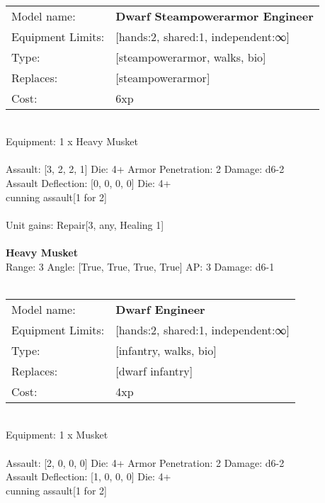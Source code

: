  
\ \\

\noindent
\begin{tabular}{ll}
Model name: &{\bf Dwarf Steampowerarmor Engineer } \\
Equipment Limits: &[hands:2, shared:1, independent:∞] \\
Type: &[steampowerarmor, walks, bio] \\
Replaces: &[steampowerarmor] \\
Cost: & 6xp\\
\end{tabular}
\ \\
Equipment: 1 x Heavy Musket \\
\ \\
Assault: [3, 2, 2, 1] Die: 4+ Armor Penetration: 2 Damage: d6-2 \\
Assault Deflection: [0, 0, 0, 0] Die: 4+\\
\indent cunning assault[1 for 2]\\ 
 
\ \\
Unit gains: Repair[3, any, Healing 1]\\ 

\ \\
{\bf Heavy Musket } \\



Range: 3  Angle: [True, True, True, True] AP: 3 Damage: d6-1 \\




 
\ \\

\noindent
\begin{tabular}{ll}
Model name: &{\bf Dwarf Engineer } \\
Equipment Limits: &[hands:2, shared:1, independent:∞] \\
Type: &[infantry, walks, bio] \\
Replaces: &[dwarf infantry] \\
Cost: & 4xp\\
\end{tabular}
\ \\
Equipment: 1 x Musket \\
\ \\
Assault: [2, 0, 0, 0] Die: 4+ Armor Penetration: 2 Damage: d6-2 \\
Assault Deflection: [1, 0, 0, 0] Die: 4+\\
\indent cunning assault[1 for 2]\\ 
 
